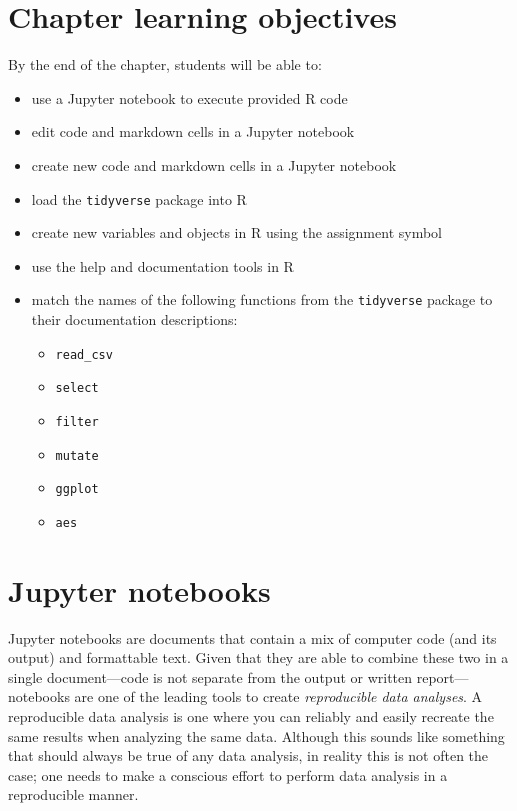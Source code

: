 \documentclass[
]{krantz}
\providecommand{\tightlist}{%
  \setlength{\itemsep}{0pt}\setlength{\parskip}{0pt}}
\begin{document}
\hypertarget{chapter-learning-objectives}{%
\section{Chapter learning objectives}\label{chapter-learning-objectives}}

By the end of the chapter, students will be able to:

\begin{itemize}
\tightlist
\item
  use a Jupyter notebook to execute provided R code
\item
  edit code and markdown cells in a Jupyter notebook
\item
  create new code and markdown cells in a Jupyter notebook
\item
  load the \texttt{tidyverse} package into R
\item
  create new variables and objects in R using the assignment symbol
\item
  use the help and documentation tools in R
\item
  match the names of the following functions from the \texttt{tidyverse} package to their documentation descriptions:

  \begin{itemize}
  \tightlist
  \item
    \texttt{read\_csv}
  \item
    \texttt{select}
  \item
    \texttt{filter}
  \item
    \texttt{mutate}
  \item
    \texttt{ggplot}
  \item
    \texttt{aes}
  \end{itemize}
\end{itemize}

\hypertarget{jupyter-notebooks}{%
\section{Jupyter notebooks}\label{jupyter-notebooks}}

Jupyter notebooks are documents that contain a mix of computer code (and its output) and formattable text. Given that they are able to combine these two in a single document---code is not separate from the output or written report---notebooks are one of the leading tools to create \emph{reproducible data analyses}. A reproducible data analysis is one where you can reliably and easily recreate the same results when analyzing the same data. Although this sounds like something that should always be true of any data analysis, in reality this is not often the case; one needs to make a conscious effort to perform data analysis in a reproducible manner.
\end{document}
